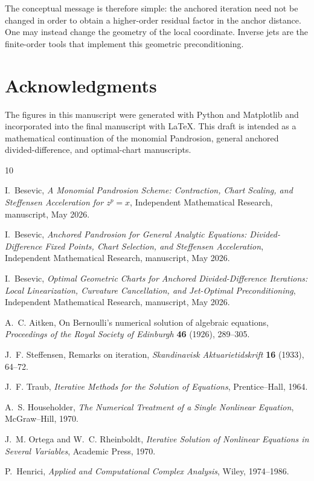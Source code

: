 \documentclass[11pt]{article}
\theoremstyle{definition}
\begin{document}
The conceptual message is therefore simple: the anchored iteration need not be changed in order to obtain a higher-order residual factor in the anchor distance. One may instead change the geometry of the local coordinate. Inverse jets are the finite-order tools that implement this geometric preconditioning.

\section*{Acknowledgments}
The figures in this manuscript were generated with Python and Matplotlib and incorporated into the final manuscript with \LaTeX. This draft is intended as a mathematical continuation of the monomial Pandrosion, general anchored divided-difference, and optimal-chart manuscripts.

\begin{thebibliography}{10}

I.~Besevic,
\newblock \emph{A Monomial Pandrosion Scheme: Contraction, Chart Scaling, and Steffensen Acceleration for $z^p=x$},
\newblock Independent Mathematical Research, manuscript, May 2026.

I.~Besevic,
\newblock \emph{Anchored Pandrosion for General Analytic Equations: Divided-Difference Fixed Points, Chart Selection, and Steffensen Acceleration},
\newblock Independent Mathematical Research, manuscript, May 2026.

I.~Besevic,
\newblock \emph{Optimal Geometric Charts for Anchored Divided-Difference Iterations: Local Linearization, Curvature Cancellation, and Jet-Optimal Preconditioning},
\newblock Independent Mathematical Research, manuscript, May 2026.

A.~C. Aitken,
\newblock On Bernoulli's numerical solution of algebraic equations,
\newblock \emph{Proceedings of the Royal Society of Edinburgh} \textbf{46} (1926), 289--305.

J.~F. Steffensen,
\newblock Remarks on iteration,
\newblock \emph{Skandinavisk Aktuarietidskrift} \textbf{16} (1933), 64--72.

J.~F. Traub,
\newblock \emph{Iterative Methods for the Solution of Equations},
\newblock Prentice--Hall, 1964.

A.~S. Householder,
\newblock \emph{The Numerical Treatment of a Single Nonlinear Equation},
\newblock McGraw--Hill, 1970.

J.~M. Ortega and W.~C. Rheinboldt,
\newblock \emph{Iterative Solution of Nonlinear Equations in Several Variables},
\newblock Academic Press, 1970.

P.~Henrici,
\newblock \emph{Applied and Computational Complex Analysis},
\newblock Wiley, 1974--1986.

\end{thebibliography}
\end{document}
